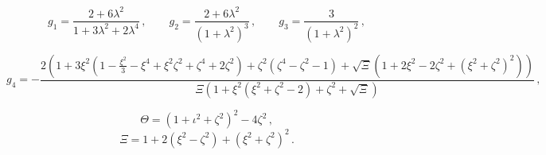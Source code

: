 \documentclass[11pt,a4paper]{article}
\begin{document}
\begin{equation}
g_1 = \frac{2 + 6 \lambda^2}{1 + 3 \lambda^2 + 2 \lambda^4} \,, \qquad g_2 = \frac{2 + 6 \lambda^2}{\left(1 + \lambda^2\right)^3} \,, \qquad g_3 = \frac{3}{(1+\lambda^2)^2} \,, \nonumber
\end{equation}
\begin{footnotesize}
\begin{equation}
g_4 = - \frac{2 \left(1 + 3 \xi^2 \left(1 - \frac{\xi^2}{3} - \xi^4 + \xi^2 \zeta^2 + \zeta^4 + 2 \zeta^2\right) + \zeta^2 \left(\zeta^4 - \zeta^2 - 1\right) + \sqrt{\Xi} \left(1 + 2 \xi^2  - 2 \zeta^2 + (\xi^2 + \zeta^2)^2\right) \right)}{\Xi \left(1 + \xi^2 \left(\xi^2 + \zeta^2 - 2\right) + \zeta^2 + \sqrt{\Xi} \right)} \,, \nonumber
\end{equation}
\end{footnotesize}
\begin{equation}
\Theta = \left(1 + \iota^2 + \zeta^2 \right)^2 - 4 \zeta^2 \,, \nonumber
\end{equation}
\begin{equation}
\Xi = 1 + 2 \left(\xi^2 - \zeta^2\right) + \left(\xi^2 + \zeta^2\right)^2 \,. \nonumber
\end{equation}
\end{document}
